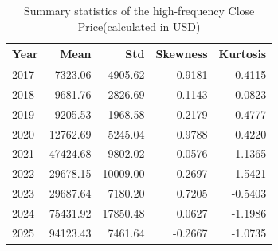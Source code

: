 \documentclass{elsarticle}
\begin{document}
\begin{table}[H]
  \caption{Summary statistics of the high-frequency Close Price(calculated in USD)}
  \label{tab:price_stats}
  \centering
  \begin{tabular}{lrrrr}
    \hline\noalign{\smallskip}
    \textbf{Year} & \textbf{Mean} & \textbf{Std} & \textbf{Skewness} & \textbf{Kurtosis} \\
    \hline\noalign{\smallskip}
    2017 & 7323.06  & 4905.62  & 0.9181   & -0.4115  \\
    2018 & 9681.76  & 2826.69  & 0.1143   & 0.0823   \\
    2019 & 9205.53  & 1968.58  & -0.2179  & -0.4777  \\
    2020 & 12762.69 & 5245.04  & 0.9788   & 0.4220   \\
    2021 & 47424.68 & 9802.02  & -0.0576  & -1.1365  \\
    2022 & 29678.15 & 10009.00 & 0.2697   & -1.5421  \\
    2023 & 29687.64 & 7180.20  & 0.7205   & -0.5403  \\
    2024 & 75431.92 & 17850.48 & 0.0627   & -1.1986  \\
    2025 & 94123.43 & 7461.64  & -0.2667  & -1.0735  \\
    \hline
  \end{tabular}
\end{table}
\end{document}

